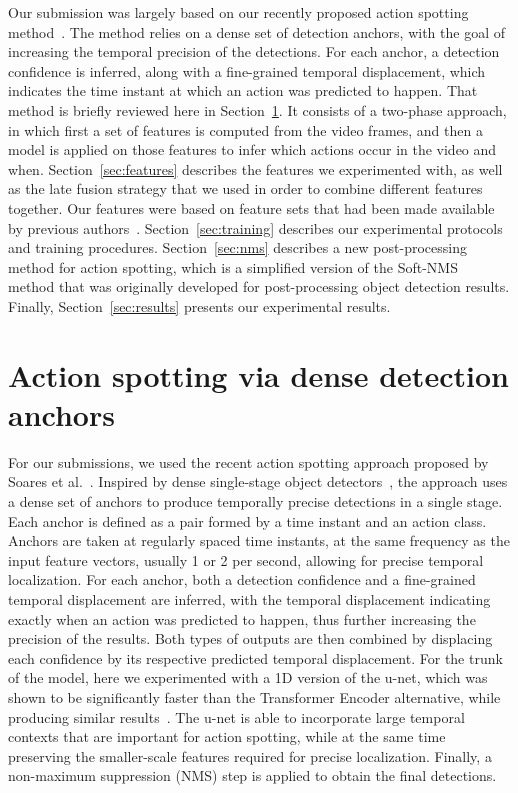 \documentclass[10pt,twocolumn,letterpaper]{article}
\begin{document}
Our submission was largely based on our recently proposed action spotting method~\cite{soares2022temporally}. The method relies on a dense set of detection anchors, with the goal of increasing the temporal precision of the detections. For each anchor, a detection confidence is inferred, along with a fine-grained temporal displacement, which indicates the time instant at which an action was predicted to happen. That method is briefly reviewed here in Section~\ref{sec:dense}. It consists of a two-phase approach, in which first a set of features is computed from the video frames, and then a model is applied on those features to infer which actions occur in the video and when. Section~\ref{sec:features} describes the features we experimented with, as well as the late fusion strategy that we used in order to combine different features together. Our features were based on feature sets that had been made available by previous authors~\cite{zhou2021feature,deliege2021soccernet}. Section~\ref{sec:training} describes our experimental protocols and training procedures. Section~\ref{sec:nms} describes a new post-processing method for action spotting, which is a simplified version of the Soft-NMS~\cite{bodla2017soft} method that was originally developed for post-processing object detection results. Finally, Section~\ref{sec:results} presents our experimental results.

\section{Action spotting via dense detection anchors}
\label{sec:dense}

For our submissions, we used the recent action spotting approach proposed by Soares et al.~\cite{soares2022temporally}. Inspired by dense single-stage object detectors~\cite{lin2017focal}, the approach uses a dense set of anchors to produce temporally precise detections in a single stage. Each anchor is defined as a pair formed by a time instant and an action class. Anchors are taken at regularly spaced time instants, at the same frequency as the input feature vectors, usually 1 or 2 per second, allowing for precise temporal localization. For each anchor, both a detection confidence and a fine-grained temporal displacement are inferred, with the temporal displacement indicating exactly when an action was predicted to happen, thus further increasing the precision of the results. Both types of outputs are then combined by displacing each confidence by its respective predicted temporal displacement. For the trunk of the model, here we experimented with a 1D version of the u-net, which was shown to be significantly faster than the Transformer Encoder alternative, while producing similar results~\cite{soares2022temporally}. The u-net is able to incorporate large temporal contexts that are important for action spotting, while at the same time preserving the smaller-scale features required for precise localization. Finally, a non-maximum suppression (NMS) step is applied to obtain the final detections. 
\end{document}
